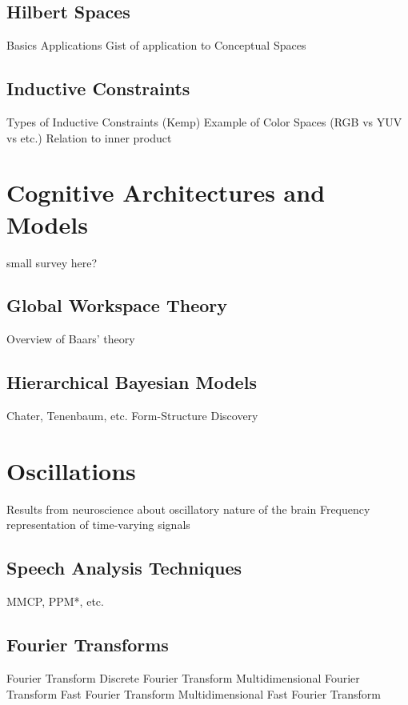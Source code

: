 \documentclass{article}
\begin{document}
\subsection{Hilbert Spaces}
Basics
Applications
Gist of application to Conceptual Spaces

\subsection{Inductive Constraints}
Types of Inductive Constraints (Kemp)
Example of Color Spaces (RGB vs YUV vs etc.)
Relation to inner product


\section{Cognitive Architectures and Models}
small survey here?

\subsection{Global Workspace Theory}
Overview of Baars' theory

\subsection{Hierarchical Bayesian Models}
Chater, Tenenbaum, etc.
Form-Structure Discovery


\section{Oscillations}
Results from neuroscience about oscillatory nature of the brain
Frequency representation of time-varying signals

\subsection{Speech Analysis Techniques}
MMCP, PPM*, etc.

\subsection{Fourier Transforms}
Fourier Transform
Discrete Fourier Transform
Multidimensional Fourier Transform
Fast Fourier Transform
Multidimensional Fast Fourier Transform
\end{document}
